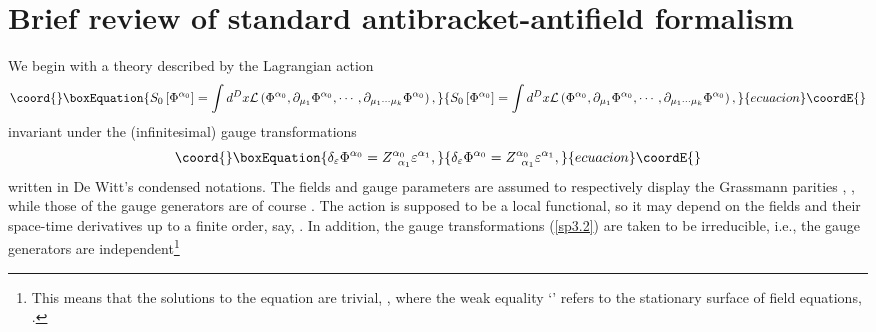 \documentclass[a4paper,12pt]{article}
\begin{document}
\section{Brief review of standard antibracket-antifield formalism}

We begin with a theory described by the Lagrangian action 
\begin{equation}\coord{}\boxEquation{
S_{0}\left[ \Phi ^{\alpha _{0}}\right] =\int d^{D}x\mathcal{L}\left( \Phi
^{\alpha _{0}},\partial _{\mu _{1}}\Phi ^{\alpha _{0}},\cdots ,\partial
_{\mu _{1}\cdots \mu _{k}}\Phi ^{\alpha _{0}}\right) ,  \label{sp3.1}
}{
S_{0}\left[ \Phi ^{\alpha _{0}}\right] =\int d^{D}x\mathcal{L}\left( \Phi
^{\alpha _{0}},\partial _{\mu _{1}}\Phi ^{\alpha _{0}},\cdots ,\partial
_{\mu _{1}\cdots \mu _{k}}\Phi ^{\alpha _{0}}\right) ,  }{ecuacion}\coordE{}\end{equation}
invariant under the (infinitesimal) gauge transformations 
\begin{equation}\coord{}\boxEquation{
\delta _{\varepsilon }\Phi ^{\alpha _{0}}=Z_{\;\;\alpha _{1}}^{\alpha
_{0}}\varepsilon ^{\alpha _{1}},  \label{sp3.2}
}{
\delta _{\varepsilon }\Phi ^{\alpha _{0}}=Z_{\;\;\alpha _{1}}^{\alpha
_{0}}\varepsilon ^{\alpha _{1}},  }{ecuacion}\coordE{}\end{equation}
written in De Witt's condensed notations. The fields and gauge parameters
are assumed to respectively display the Grassmann parities \coordHE{}, \coordHE{}, while
those of the gauge generators are of course \coordHE{}%
. The action \coordHE{} is supposed to be a
local functional, so it may depend on the fields and their space-time
derivatives up to a finite order, say, \coordHE{}. In addition, the gauge
transformations (\ref{sp3.2}) are taken to be irreducible, i.e., the gauge
generators are independent\footnote{%
This means that the solutions to the equation \coordHE{} are trivial, \coordHE{}, where the
weak equality `\myHighlight{$\approx $}\coordHE{}' refers to the stationary surface of field
equations, \coordHE{}.}%
\end{document}
